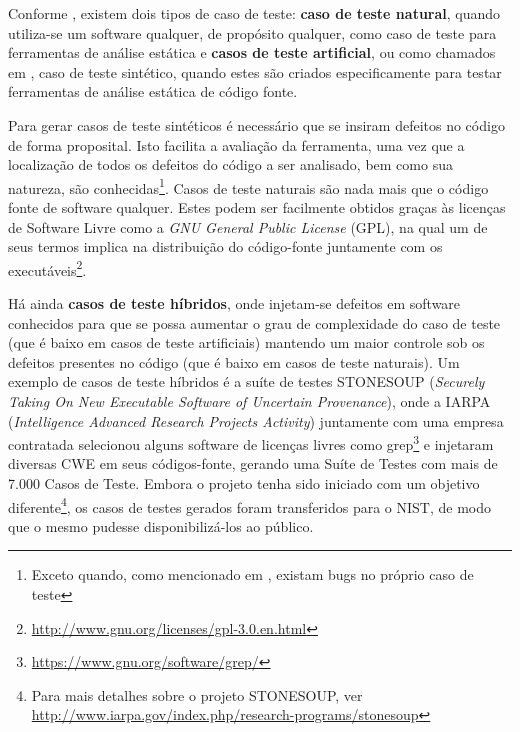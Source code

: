   Conforme \cite{nsa}, existem dois tipos de caso de teste: \textbf{caso de teste natural}, quando utiliza-se um software qualquer, de propósito qualquer, como caso de teste para ferramentas de análise estática e \textbf{casos de teste artificial}, ou como chamados em \cite {juliet}, caso de teste sintético, quando estes são criados especificamente para testar ferramentas de análise estática de código fonte.

  Para gerar casos de teste sintéticos é necessário que se insiram defeitos no código de forma proposital. Isto facilita a avaliação da ferramenta, uma vez que a localização de todos os defeitos do código a ser analisado, bem como sua natureza, são conhecidas\footnote{Exceto quando, como mencionado em \cite{pascal}, existam bugs no próprio caso de teste}. Casos de teste naturais são nada mais que o código fonte de software qualquer. Estes podem ser facilmente obtidos graças às licenças de Software Livre como a \textit{GNU General Public License} (GPL),  na qual um de seus termos implica na distribuição do código-fonte juntamente com os executáveis\footnote{\url{http://www.gnu.org/licenses/gpl-3.0.en.html}}.

  Há ainda \textbf{casos de teste híbridos}, onde injetam-se defeitos em software conhecidos para que se possa aumentar o grau de complexidade do caso de teste (que é baixo em casos de teste artificiais) mantendo um maior controle sob os defeitos presentes no código (que é baixo em casos de teste naturais). Um exemplo de casos de teste híbridos é a suíte de testes STONESOUP (\textit{Securely Taking On New Executable Software of Uncertain Provenance}), onde a IARPA (\textit{Intelligence Advanced Research Projects Activity}) juntamente com uma empresa contratada selecionou alguns software de licenças livres como grep\footnote{\url{https://www.gnu.org/software/grep/}} e injetaram diversas CWE em seus códigos-fonte, gerando uma Suíte de Testes com mais de 7.000 Casos de Teste. Embora o projeto tenha sido iniciado com um objetivo diferente\footnote{Para mais detalhes sobre o projeto STONESOUP, ver \url{http://www.iarpa.gov/index.php/research-programs/stonesoup}}, os casos de testes gerados foram transferidos para o NIST, de modo que o mesmo pudesse disponibilizá-los ao público.

